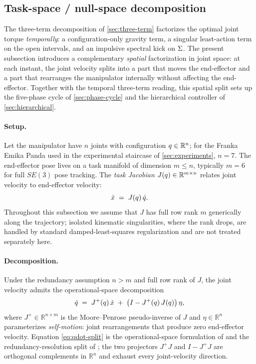\subsection{Task-space / null-space decomposition}
\label{sec:task-null}

The three-term decomposition of \cref{sec:three-term} factorizes the
optimal joint torque \emph{temporally}: a configuration-only gravity
term, a singular least-action term on the open intervals, and an
impulsive spectral kick on $\Sigma$. The present subsection
introduces a complementary \emph{spatial} factorization in joint
space: at each instant, the joint velocity splits into a part that
moves the end-effector and a part that rearranges the manipulator
internally without affecting the end-effector. Together with the
temporal three-term reading, this spatial split sets up the
five-phase cycle of \cref{sec:phase-cycle} and the hierarchical
controller of \cref{sec:hierarchical}.

\paragraph{Setup.}
Let the manipulator have $n$ joints with configuration
$q \in \mathbb{R}^{n}$; for the Franka Emika Panda used in
the experimental staircase of \cref{sec:experiments}, $n = 7$. The
end-effector pose lives on a task manifold of dimension
$m \le n$, typically $m = 6$ for full $SE(3)$ pose tracking. The
\emph{task Jacobian} $J(q) \in \mathbb{R}^{m \times n}$
relates joint velocity to end-effector velocity:
\begin{equation}
\label{eq:task-jacobian}
  \dot x \;=\; J(q)\, \dot{q}.
\end{equation}
Throughout this subsection we assume that $J$ has full row rank $m$
generically along the trajectory; isolated kinematic singularities,
where the rank drops, are handled by standard damped-least-squares
regularization and are not treated separately here.

\paragraph{Decomposition.}
Under the redundancy assumption $n > m$ and full row rank of $J$,
the joint velocity admits the operational-space decomposition
\begin{equation}
\label{eq:qdot-split}
  \dot{q}
  \;=\; J^{+}(q)\, \dot x
  \;+\; \bigl(I - J^{+}(q)\, J(q)\bigr)\, \eta,
\end{equation}
where $J^{+} \in \mathbb{R}^{n \times m}$ is the Moore--Penrose
pseudo-inverse of $J$ and $\eta \in \mathbb{R}^{n}$ parameterizes
\emph{self-motion}: joint rearrangements that produce zero
end-effector velocity. Equation \eqref{eq:qdot-split} is the
operational-space formulation of \citet{Khatib1987} and the
redundancy-resolution split of \citet{Nakamura1991}; the two
projectors $J^{+} J$ and $I - J^{+} J$ are orthogonal complements
in $\mathbb{R}^{n}$ and exhaust every joint-velocity direction.

